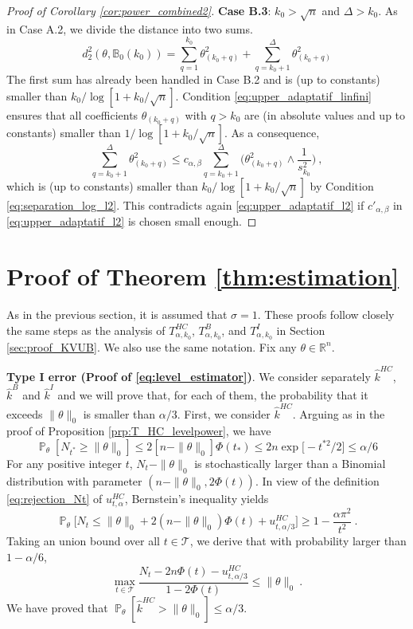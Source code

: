 \documentclass[twoside,11pt]{article}
\def\cT{\mathcal{T}}
\renewcommand{\P}{\operatorname{\mathbb{P}}}
\newcommand{\<}{\langle}
\renewcommand{\>}{\rangle}
\begin{document}
\begin{proof}[Proof of Corollary \ref{cor:power_combined2}]
 \bigskip 
 
 
 \noindent 
 {\bf Case B.3}: $k_0> \sqrt{n}$ and $\Delta> k_0$. As in Case A.2, we divide the distance into two sums. 
 \[
  d^2_2(\theta,\mathbb{B}_0(k_0))= \sum_{q=1}^{k_0}\theta^2_{(k_0+q)}+ \sum_{q=k_0+1}^{\Delta}\theta^2_{(k_0+q)}
 \]
The first sum has already been handled in Case B.2 and is (up to constants) smaller than $k_0/\log[1+k_0/\sqrt{n}]$. Condition \eqref{eq:upper_adaptatif_linfini} ensures that 
 all coefficients $\theta_{(k_0+q)}$ with $q>k_0$ are (in absolute values and up to  constants) smaller than $1/\log[1+k_0/\sqrt{n}]$. As a consequence, 
 \[
  \sum_{q=k_0+1}^{\Delta}\theta^2_{(k_0+q)}\leq c_{\alpha,\beta}\sum_{q=k_0+1}^{\Delta} \big(\theta^2_{(k_0+q)}\wedge \frac{1}{s_{k_0}^2}\big)\ ,
 \]
which is (up to constants) smaller than $k_0/\log[1+k_0/\sqrt{n}]$ by Condition \eqref{eq:separation_log_l2}. This contradicts again  \eqref{eq:upper_adaptatif_l2}  if $c'_{\alpha,\beta}$ in \eqref{eq:upper_adaptatif_l2} is chosen small enough.
 
 
 \end{proof}




\section{Proof of Theorem \ref{thm:estimation}}


As in the previous section, it is assumed that $\sigma=1$. 
   These proofs follow closely the same steps as the analysis of $T^{HC}_{\alpha,k_0}$, $T^B_{\alpha,k_0}$, and $T^I_{\alpha,k_0}$ in Section \ref{sec:proof_KVUB}. We also use the same notation. Fix any $\theta\in \mathbb{R}^n$.
 \bigskip
 
 \noindent 
 {\bf Type I error (Proof of \eqref{eq:level_estimator})}. We consider separately $\widehat{k}^{HC}$, $\widehat{k}^{B}$ and $\widehat{k}^{I}$ and we will prove that, for each of them, the probability that it exceeds $\|\theta\|_0$ is smaller than $\alpha/3$. First, we consider $\widehat{k}^{HC}$. Arguing as in the proof of Proposition \ref{prp:T_HC_levelpower}, we have
 \[\P_{\theta}[N_{t^*}\geq \|\theta\|_0]\leq 2[n-\|\theta\|_0]\Phi(t_*)\leq 2n \exp\big[-t^{*2}/2\big]\leq \alpha/6\]
 For any positive integer $t$, $N_t-\|\theta\|_0$ is stochastically larger than a Binomial distribution with parameter $(n-\|\theta\|_0, 2\Phi(t))$. In view of the definition \ref{eq:rejection_Nt} of $u_{t,\alpha}^{HC}$, Bernstein's inequality yields
 \[
  \P_{\theta}\big[N_{t}\leq  \|\theta\|_0 + 2(n-\|\theta\|_0)\Phi(t)+ u_{t,\alpha/3}^{HC}\big]\geq 1 - \frac{\alpha \pi^2}{t^2}\ .
 \]
Taking an union bound over all $t\in \cT$, we derive that with probability larger than $1-\alpha/6$, 
\[
 \max_{t\in \cT}\frac{N_t- 2n\Phi(t)- u^{HC}_{t,\alpha/3}}{1-2\Phi(t)}\leq \|\theta\|_0\ .
\]
We have proved that $\P_{\theta}[\widehat{k}^{HC}>\|\theta\|_0]\leq \alpha/3$. 
 
\end{document}
